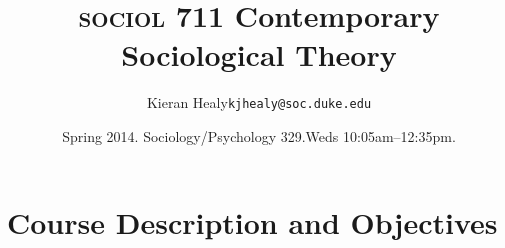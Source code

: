 \documentclass[11pt,article,oneside]{memoir}
\makeatletter
\def\myauthor{Author}
\def\mytitle{Title}
\def\mycopyright{\myauthor}
\def\myemail{kjhealy@soc.duke.edu}
\def\myauthor{Kieran Healy}
\def\mytitle{{\normalsize \textsc{sociol} 711\newline} \HUGE Contemporary Sociological Theory}
\makeatother
\begin{document}












\def\ind{\hangindent=1 true cm\hangafter=1 \noindent}

\def\labelitemi{$\cdot$}









\title{\LARGE \mytitle}     

\author{\Large\myauthor \newline \footnotesize\texttt{\noindent\myemail}}

\date{Spring 2014. Sociology/Psychology 329.\newline Weds 10:05am--12:35pm.}



\published{\,}



\maketitle




\thispagestyle{kjhgit}









%


%



\section{Course Description and Objectives}





\end{document}
